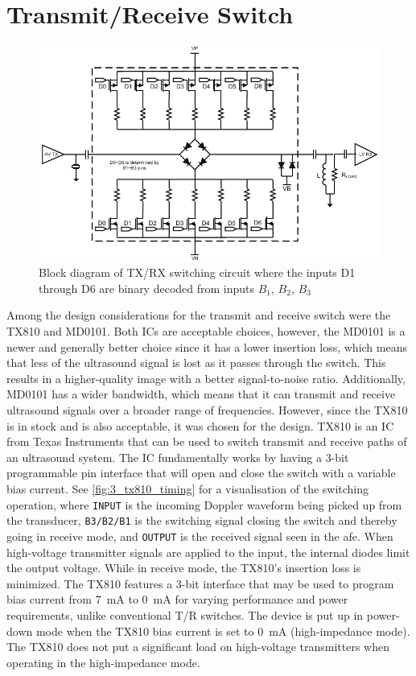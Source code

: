\section{Transmit/Receive Switch}
\begin{figure}[htbp]
	\centering
	\includegraphics[width=.8\textwidth]{Figures/3_switch_tx810_block.pdf}
	\caption[Block diagram of TX/RX switching circuit]{Block diagram of TX/RX switching circuit where the inputs D1 through D6 are binary decoded from inputs $B_1$, $B_2$, $B_3$ \cite{TX810}}
	\label{fig:3_switch}
\end{figure}
Among the design considerations for the transmit and receive switch were the TX810\cite{TX810} and MD0101\cite{MD0101}. Both ICs are acceptable choices, however, the MD0101 is a newer and generally better choice since it has a lower insertion loss, which means that less of the ultrasound signal is lost as it passes through the switch. This results in a higher-quality image with a better signal-to-noise ratio. Additionally, MD0101 has a wider bandwidth, which means that it can transmit and receive ultrasound signals over a broader range of frequencies. However, since the TX810 is in stock and is also acceptable, it was chosen for the design. TX810 is an IC from Texas Instruments that can be used to switch transmit and receive paths of an ultrasound system. The IC fundamentally works by having a 3-bit programmable pin interface that will open and close the switch with a variable bias current. See \cref{fig:3_tx810_timing} for a visualisation of the switching operation, where \texttt{INPUT} is the incoming Doppler waveform being picked up from the transducer, \texttt{B3/B2/B1} is the switching signal closing the switch and thereby going in receive mode, and \texttt{OUTPUT} is the received signal seen in the \gls{afe}. When high-voltage transmitter signals are applied to the input, the internal diodes limit the output voltage. While in receive mode, the TX810's insertion loss is minimized. The TX810 features a 3-bit interface that may be used to program bias current from \qty{7}{\milli\ampere} to \qty{0}{\milli\ampere} for varying performance and power requirements, unlike conventional T/R switches. The device is put up in power-down mode when the TX810 bias current is set to \qty{0}{\milli\ampere} (high-impedance mode). The TX810 does not put a significant load on high-voltage transmitters when operating in the high-impedance mode.
